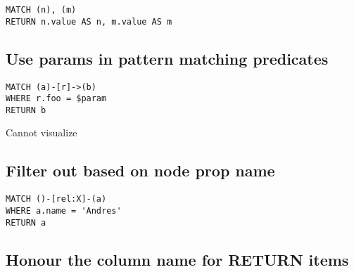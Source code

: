 \begin{lstlisting}
MATCH (n), (m)
RETURN n.value AS n, m.value AS m
\end{lstlisting}

\subsection{Use params in pattern matching predicates}

\begin{lstlisting}
MATCH (a)-[r]->(b)
WHERE r.foo = $param
RETURN b
\end{lstlisting}

Cannot visualize
\subsection{Filter out based on node prop name}

\begin{lstlisting}
MATCH ()-[rel:X]-(a)
WHERE a.name = 'Andres'
RETURN a
\end{lstlisting}

\subsection{Honour the column name for RETURN items}

